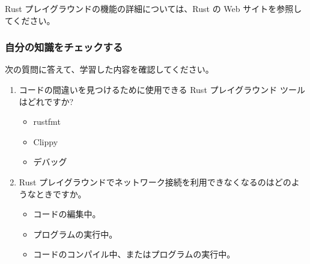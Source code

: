 Rust プレイグラウンドの機能の詳細については、Rust の Web サイトを参照してください。


\subsubsection{自分の知識をチェックする}

次の質問に答えて、学習した内容を確認してください。

\begin{enumerate}
\item コードの間違いを見つけるために使用できる Rust プレイグラウンド ツールはどれですか?
\begin{itemize}
\item rustfmt
\item Clippy
\item デバッグ
\end{itemize}
\item Rust プレイグラウンドでネットワーク接続を利用できなくなるのはどのようなときですか。
\begin{itemize}
\item コードの編集中。
\item プログラムの実行中。
\item コードのコンパイル中、またはプログラムの実行中。
\end{itemize}

\end{enumerate}


